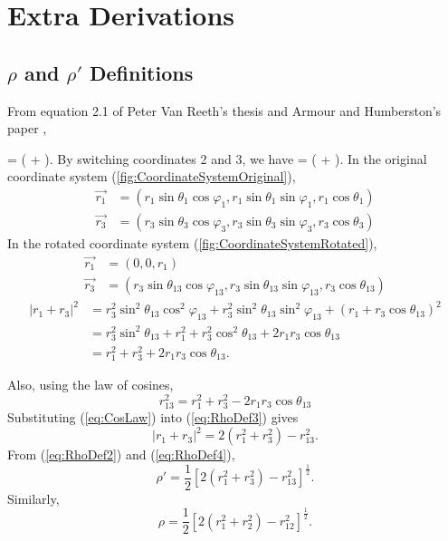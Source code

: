 \documentclass[Dissertation.tex]{subfiles}
\begin{document}
\chapter{Extra Derivations}
\label{chp:ExtraDer}


\section{\texorpdfstring{$\rho$ and $\rho'$} {rho and rho'} Definitions}
\label{sec:RhoDef}
From equation 2.1 of Peter Van Reeth's thesis \cite{VanReethThesis} and Armour and Humberston's paper \cite{Armour1991},

\beq
\vec{\rho} =  \left(  +  \right).
\label{eq:RhoDef1}
\eeq
By switching coordinates 2 and 3, we have
\beq
{} =  \left(  +  \right).
\label{eq:RhoDef2}
\eeq
In the original coordinate system (\cref{fig:CoordinateSystemOriginal}),
\begin{align}
\nonumber \vec{r_1} &= \left( r_1 \sin \theta_1 \cos \varphi_1, r_1 \sin \theta_1 \sin \varphi_1, r_1 \cos \theta_1 \right) \\
\vec{r_3} &= \left( r_3 \sin \theta_3 \cos \varphi_3, r_3 \sin \theta_3 \sin \varphi_3, r_3 \cos \theta_3 \right)
\end{align}
In the rotated coordinate system (\cref{fig:CoordinateSystemRotated}),
\begin{align}
\nonumber \vec{r_1} &= (0, 0, r_1) \\
\vec{r_3} &= \left( r_3 \sin \theta_{13} \cos \varphi_{13}, r_3 \sin \theta_{13} \sin \varphi_{13}, r_3 \cos \theta_{13} \right)
\end{align}
\begin{align}
\nonumber \left| r_1 + r_3 \right|^2 &= r_3^2 \sin^2 \theta_{13} \cos^2 \varphi_{13} + r_3^2 \sin^2 \theta_{13} \sin^2 \varphi_{13} + (r_1 + r_3 \cos \theta_{13})^2\\
\nonumber &= r_3^2 \sin^2 \theta_{13} + r_1^2 + r_3^2 \cos^2 \theta_{13} + 2 r_1 r_3 \cos \theta_{13} \\
&= r_1^2 + r_3^2 + 2 r_1 r_3 \cos \theta_{13}.
\label{eq:RhoDef3}
\end{align}

Also, using the law of cosines,
\begin{equation}
r_{13}^2 = r_1^2 + r_3^2 - 2 r_1 r_3 \cos \theta_{13}
\label{eq:CosLaw}
\end{equation}
Substituting (\ref{eq:CosLaw}) into (\ref{eq:RhoDef3}) gives
\begin{equation}
\left| r_1 + r_3 \right|^2 = 2 \left( r_1^2 + r_3^2 \right) - r_{13}^2.
\label{eq:RhoDef4}
\end{equation}
From (\ref{eq:RhoDef2}) and (\ref{eq:RhoDef4}),
\begin{equation}
\label{eq:RhopRDef}
\rho' = \frac{1}{2} \left[ 2 \left(r_1^2 + r_3^2 \right) - r_{13}^2 \right] ^ \frac{1}{2}.
\end{equation}
Similarly,
\begin{equation}
\label{eq:RhoRDef}
\rho = \frac{1}{2} \left[ 2 \left(r_1^2 + r_2^2 \right) - r_{12}^2 \right] ^ \frac{1}{2}.
\end{equation}
\end{document}
